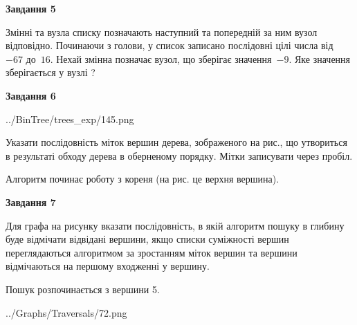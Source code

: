 \documentclass[12pt, ukrainian]{article}
\begin{document}
{\begin {large}
{\begin {center}\textbf{Завдання 5}\end {center}}\par
Змінні  та  вузла списку позначають наступний та попередній за ним вузол відповідно. Починаючи з голови, у список записано послідовні цілі числа від~$-67$ до~$16$. Нехай змінна  позначає вузол, що зберігає значення~$-9$.
Яке значення зберігається у вузлі  ?\par
\newpage

{\begin {center}\textbf{Завдання 6}\end {center}}\par

\begin{center}
	{../BinTree/trees_exp/145.png}
\end{center}
Указати послідовність міток вершин дерева, зображеного на рис., що утвориться в результаті обходу дерева в оберненому порядку. Мітки записувати через пробіл.\par Алгоритм починає роботу з кореня (на рис. це верхня вершина).\par
\newpage

{\begin {center}\textbf{Завдання 7}\end {center}}\par
Для графа на рисунку вказати послідовність, в якій алгоритм пошуку в глибину буде відмічати відвідані вершини, якщо списки суміжності вершин переглядаються алгоритмом за зростанням міток вершин та вершини відмічаються на першому вход\-женні у вершину.\par
Пошук розпочинається з вершини 5.\par

\begin{center}
	{../Graphs/Traversals/72.png}
\end{center}\par
\newpage


\end{large}}
\end{document}
